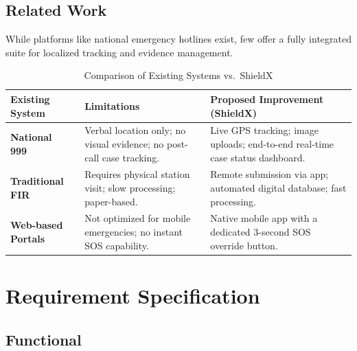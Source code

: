 \documentclass[12pt, a4paper, twoside, openany]{report}
\begin{document}
\section{Related Work}
While platforms like national emergency hotlines exist, few offer a fully integrated suite for localized tracking and evidence management.
\begin{table}[ht]
\centering
\caption{Comparison of Existing Systems vs.\ ShieldX}
\label{tab:comparison}
\begin{tabularx}{\textwidth}{p{3.5cm} X X}
\toprule
\textbf{Existing System} & \textbf{Limitations} & \textbf{Proposed Improvement (ShieldX)} \\
\midrule
\textbf{National 999}~\cite{bd999} & Verbal location only; no visual evidence; no post-call case tracking. & Live GPS tracking; image uploads; end-to-end real-time case status dashboard. \\
\addlinespace
\textbf{Traditional FIR}~\cite{fir_process} & Requires physical station visit; slow processing; paper-based. & Remote submission via app; automated digital database; fast processing. \\
\addlinespace
\textbf{Web-based Portals}~\cite{webportals} & Not optimized for mobile emergencies; no instant SOS capability. & Native mobile app with a dedicated 3-second SOS override button. \\
\bottomrule
\end{tabularx}
\end{table}
\chapter{Requirement Specification}
\section{Functional}
\end{document}

